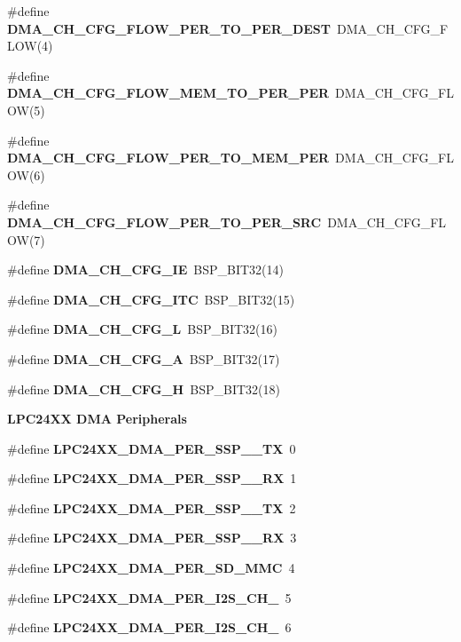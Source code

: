 \begin{Indent}
\begin{DoxyCompactItemize}
\#define {\bfseries D\+M\+A\+\_\+\+C\+H\+\_\+\+C\+F\+G\+\_\+\+F\+L\+O\+W\+\_\+\+P\+E\+R\+\_\+\+T\+O\+\_\+\+P\+E\+R\+\_\+\+D\+E\+ST}~D\+M\+A\+\_\+\+C\+H\+\_\+\+C\+F\+G\+\_\+\+F\+L\+OW(4)
\item 
\#define {\bfseries D\+M\+A\+\_\+\+C\+H\+\_\+\+C\+F\+G\+\_\+\+F\+L\+O\+W\+\_\+\+M\+E\+M\+\_\+\+T\+O\+\_\+\+P\+E\+R\+\_\+\+P\+ER}~D\+M\+A\+\_\+\+C\+H\+\_\+\+C\+F\+G\+\_\+\+F\+L\+OW(5)
\item 
\#define {\bfseries D\+M\+A\+\_\+\+C\+H\+\_\+\+C\+F\+G\+\_\+\+F\+L\+O\+W\+\_\+\+P\+E\+R\+\_\+\+T\+O\+\_\+\+M\+E\+M\+\_\+\+P\+ER}~D\+M\+A\+\_\+\+C\+H\+\_\+\+C\+F\+G\+\_\+\+F\+L\+OW(6)
\item 
\#define {\bfseries D\+M\+A\+\_\+\+C\+H\+\_\+\+C\+F\+G\+\_\+\+F\+L\+O\+W\+\_\+\+P\+E\+R\+\_\+\+T\+O\+\_\+\+P\+E\+R\+\_\+\+S\+RC}~D\+M\+A\+\_\+\+C\+H\+\_\+\+C\+F\+G\+\_\+\+F\+L\+OW(7)
\item 
\#define {\bfseries D\+M\+A\+\_\+\+C\+H\+\_\+\+C\+F\+G\+\_\+\+IE}~B\+S\+P\+\_\+\+B\+I\+T32(14)
\item 
\#define {\bfseries D\+M\+A\+\_\+\+C\+H\+\_\+\+C\+F\+G\+\_\+\+I\+TC}~B\+S\+P\+\_\+\+B\+I\+T32(15)
\item 
\#define {\bfseries D\+M\+A\+\_\+\+C\+H\+\_\+\+C\+F\+G\+\_\+L}~B\+S\+P\+\_\+\+B\+I\+T32(16)
\item 
\#define {\bfseries D\+M\+A\+\_\+\+C\+H\+\_\+\+C\+F\+G\+\_\+A}~B\+S\+P\+\_\+\+B\+I\+T32(17)
\item 
\#define {\bfseries D\+M\+A\+\_\+\+C\+H\+\_\+\+C\+F\+G\+\_\+H}~B\+S\+P\+\_\+\+B\+I\+T32(18)
\end{DoxyCompactItemize}
\end{Indent}
\begin{Indent}\textbf{ L\+P\+C24\+XX D\+MA Peripherals}\par
\begin{DoxyCompactItemize}
\item 
\#define {\bfseries L\+P\+C24\+X\+X\+\_\+\+D\+M\+A\+\_\+\+P\+E\+R\+\_\+\+S\+S\+P\+\_\+\_\+\+TX}~0
\item 
\#define {\bfseries L\+P\+C24\+X\+X\+\_\+\+D\+M\+A\+\_\+\+P\+E\+R\+\_\+\+S\+S\+P\+\_\+\_\+\+RX}~1
\item 
\#define {\bfseries L\+P\+C24\+X\+X\+\_\+\+D\+M\+A\+\_\+\+P\+E\+R\+\_\+\+S\+S\+P\+\_\+\_\+\+TX}~2
\item 
\#define {\bfseries L\+P\+C24\+X\+X\+\_\+\+D\+M\+A\+\_\+\+P\+E\+R\+\_\+\+S\+S\+P\+\_\+\_\+\+RX}~3
\item 
\#define {\bfseries L\+P\+C24\+X\+X\+\_\+\+D\+M\+A\+\_\+\+P\+E\+R\+\_\+\+S\+D\+\_\+\+M\+MC}~4
\item 
\#define {\bfseries L\+P\+C24\+X\+X\+\_\+\+D\+M\+A\+\_\+\+P\+E\+R\+\_\+\+I2\+S\+\_\+\+C\+H\+\_}~5
\item 
\#define {\bfseries L\+P\+C24\+X\+X\+\_\+\+D\+M\+A\+\_\+\+P\+E\+R\+\_\+\+I2\+S\+\_\+\+C\+H\+\_}~6
\end{DoxyCompactItemize}
\end{Indent}
